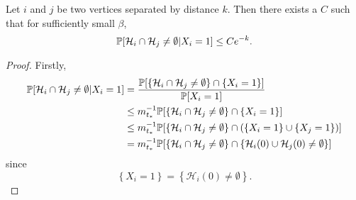 	\begin{lemma}
		\label{lem: prob intersect given X_i = 1}
		Let $i$ and $j$ be two vertices separated by distance $k$. Then there exists a $C$ such that for sufficiently small $\beta$,
		\begin{equation}
			\mathbb{P}[\mathcal{H}_i \cap \mathcal{H}_j \neq \emptyset | X_i = 1] \leq Ce^{-k}.
		\end{equation}
	\end{lemma}
	\begin{proof}
		Firstly,
		\begin{align}
			\mathbb{P}[\mathcal{H}_i \cap \mathcal{H}_j \neq \emptyset | X_i = 1] &= \frac{\mathbb{P}[\left\{\mathcal{H}_i \cap \mathcal{H}_j \neq \emptyset\right\} \cap \{X_i = 1\}]}{\mathbb{P}[X_i = 1]}\\
			&\leq m_{t_*}^{-1} \mathbb{P}[\left\{\mathcal{H}_i \cap \mathcal{H}_j \neq \emptyset\right\} \cap \{X_i = 1\}]\\
			&\leq  m_{t_*}^{-1} \mathbb{P}[\left\{\mathcal{H}_i \cap \mathcal{H}_j \neq \emptyset\right\} \cap \left(\{X_i = 1\} \cup \{X_j = 1\}\right)]\\
			&= m_{t_*}^{-1} \mathbb{P}[\left\{\mathcal{H}_i \cap \mathcal{H}_j \neq \emptyset\right\} \cap \left\{\mathcal{H}_i(0) \cup \mathcal{H}_j(0) \neq \emptyset\right\}]
			\label{eq:prob in red star}
		\end{align}
		since
		\begin{equation}
			\left\{X_i = 1\right\} = \left\{\mathcal{H}_i(0) \neq \emptyset\right\}.
		\end{equation}

\end{proof}
